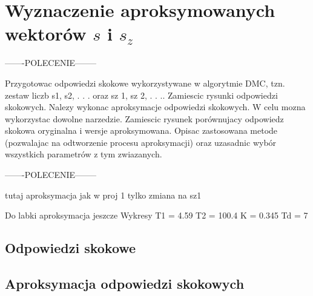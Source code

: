 \section{Wyznaczenie aproksymowanych wektorów $s$ i $s_z$ }
\label{lab:zad3}

-------POLECENIE--------

Przygotowac odpowiedzi skokowe wykorzystywane w algorytmie DMC, tzn. zestaw
liczb s1, s2, . . . oraz sz
1, sz
2, . . .. Zamiescic rysunki odpowiedzi skokowych. Nalezy wykonac
aproksymacje odpowiedzi skokowych. W celu mozna wykorzystac dowolne narzedzie.
Zamiescic rysunek porównujacy odpowiedz skokowa oryginalna i wersje aproksymowana.
Opisac zastosowana metode (pozwalajac na odtworzenie procesu aproksymacji)
oraz uzasadnic wybór wszystkich parametrów z tym zwiazanych.

-------POLECENIE--------

tutaj aproksymacja jak w proj 1 tylko zmiana na sz1

Do labki aproksymacja jeszcze
Wykresy
T1 = 4.59 T2 = 100.4 K = 0.345 Td = 7

\subsection{Odpowiedzi skokowe}
\label{lab:zad3:odpSkok}

\subsection{Aproksymacja odpowiedzi skokowych}
\label{lab:zad3:approxOdpSkok}
